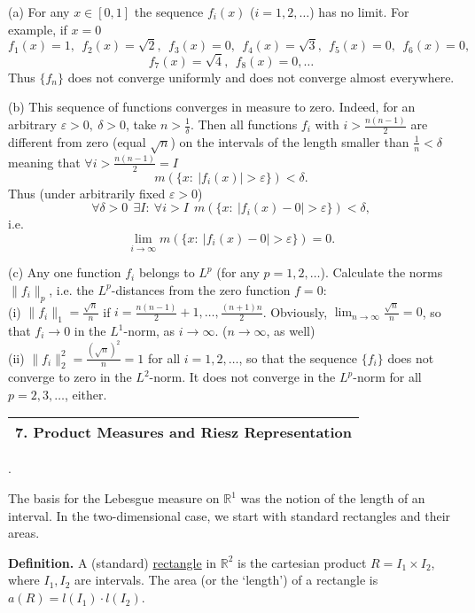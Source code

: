 \documentclass[a4paper,10pt]{article}
\def\RR{\mathbb{R}}
\newcommand{\1}[1]{\mathbf{1}_{\{#1\}}}
\begin{document}
(a) For any $x\in[0,1]$ the sequence $f_i(x)$ ($i=1,2,\ldots$) has no limit. For example, if $x=0$
  $$f_1(x)=1,~~f_2(x)=\sqrt{2},~~f_3(x)=0,~~f_4(x)=\sqrt{3},~~f_5(x)=0,~~f_6(x)=0,$$
  $$f_7(x)=\sqrt{4},~~f_8(x)=0,\ldots$$
Thus $\{f_n\}$ does not converge uniformly and does not converge almost everywhere.

(b) This sequence of functions converges in measure to zero. Indeed, for an arbitrary $\varepsilon>0,~\delta>0$, take $n>\frac{1}{\delta}$. Then all functions $f_i$ with $i>\frac{n(n-1)}{2}$ are different from zero (equal $\sqrt{n}$) on the intervals of the length smaller than $\frac{1}{n}<\delta$ meaning that $\forall i>\frac{n(n-1)}{2}=I$
  $$m(\{x:~|f_i(x)|>\varepsilon\})<\delta.$$
Thus (under arbitrarily fixed $\varepsilon>0$)
  $$\forall\delta>0 ~~\exists I:~\forall i>I~~m(\{x:~ |f_i(x)-0|>\varepsilon\})<\delta,$$
i.e.
  $$\lim_{i\to\infty} m(\{x:~|f_i(x)-0|>\varepsilon\})=0.$$

(c) Any one function $f_i$ belongs to $L^p$ (for any $p=1,2,\ldots$). Calculate the norms $\|f_i\|_p$, i.e. the $L^p$-distances from the zero function $f=0$:\\
(i) $\|f_i\|_1=\frac{\sqrt{n}}{n}$ if $i=\frac{n(n-1)}{2}+1,\ldots,\frac{(n+1)n}{2}$. Obviously, $\lim_{n\to\infty} \frac{\sqrt{n}}{n}=0$, so that $f_i\to 0$ in the $L^1$-norm, as $i\to\infty$. ($n\to\infty$, as well)\\
(ii) $\|f_i\|^2_2=\frac{(\sqrt{n})^2}{n}=1$ for all $i=1,2,\ldots$, so that the sequence $\{f_i\}$ does not converge to zero in the $L^2$-norm. It does not converge in the $L^p$-norm for all $p=2,3,\ldots$, either.
\vspace{5mm}

\begin{tabular}{|l|}
\hline {\LARGE\bf 7. Product Measures and  Riesz Representation}\\
\hline\end{tabular}.\vspace{5mm}

The basis for the Lebesgue measure on $\RR^1$ was the notion of the length of an interval. In the two-dimensional case, we start with standard rectangles and their areas. \vspace{3mm}

{\bf Definition.} A (standard) \underline{rectangle} in $\RR^2$ is the cartesian product  $R=I_1\times I_2$, where $I_1,I_2$ are intervals. The area (or the `length') of a rectangle is  $a(R)=l(I_1)\cdot l(I_2)$. \vspace{3mm}
\end{document}
